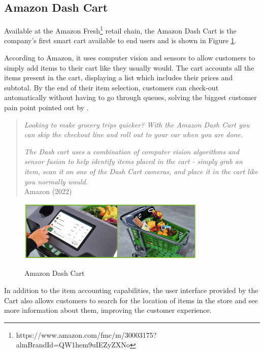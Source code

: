 \subsection{Amazon Dash Cart}

Available at the Amazon Fresh\footnote{https://www.amazon.com/fmc/m/30003175?almBrandId=QW1hem9uIEZyZXNo} retail chain, the
Amazon Dash Cart is the company's first smart cart available to end users and is shown in
Figure \ref{fig:dashcart}.

According to Amazon, it uses computer vision and sensors to allow customers to
simply add items to their cart like they usually would. The cart accounts all
the items present in the cart, displaying a list which includes their prices
and subtotal. By the end of their item selection, customers can check-out
automatically without having to go through queues, solving the biggest customer
pain point pointed out by \cite{Capgemini2020}.

\begin{quote}
\textit{Looking to make grocery trips quicker? With the Amazon Dash Cart you can skip the checkout line and roll out to your car when you are done.}

\textit{The Dash cart uses a combination of computer vision algorithms and sensor fusion to help identify items placed in the cart - simply grab an item, scan it on one of the Dash Cart cameras, and place it in the cart like you normally would.}
\\
Amazon (2022)
\end{quote}

\begin{figure}[H]
	\centering
    \caption[Amazon Dash Cart]{Amazon Dash Cart}
	\includegraphics[width=0.8\textwidth]{./images/dashcart.png}
    \label{fig:dashcart}
\end{figure}

In addition to the item accounting capabilities, the user interface provided by
the Cart also allows customers to search for the location of items  in the
store and see more information about them, improving the customer experience.


